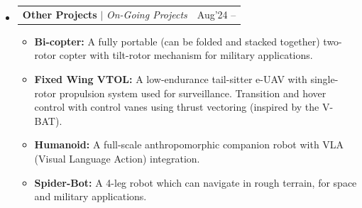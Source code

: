 \documentclass[a4paper,10pt]{article}
\makeatletter
\newcommand{\resumeProjectHeading}[2]{
	\vspace{5pt}\item
	\begin{tabular*}{0.99\textwidth}{l@{\extracolsep{\fill}}r}
		\small#1 & \small#2 \\
	\end{tabular*}\vspace{3pt}
}
\makeatother
\begin{document}
\begin{itemize}[leftmargin=0.15in, label={}]
		\resumeProjectHeading
		{\textbf{Other Projects} $|$ \emph{On-Going Projects}}{Aug'24 --}
		\begin{itemize}
			\item \small \textbf{Bi-copter:} A fully portable (can be folded and stacked together) two-rotor copter with tilt-rotor mechanism for military applications.
			\item \small \textbf{Fixed Wing VTOL:} A low-endurance tail-sitter e-UAV with single-rotor propulsion system used for surveillance. Transition and hover control with control vanes using thrust vectoring (inspired by the V-BAT).
			\item \small \textbf{Humanoid:} A full-scale anthropomorphic companion robot with VLA (Visual Language Action) integration.
			\item \small \textbf{Spider-Bot:} A 4-leg robot which can navigate in rough terrain, for space and military applications.
		\end{itemize}
		\vspace{1pt}
		
	\end{itemize}
	
\end{document}
